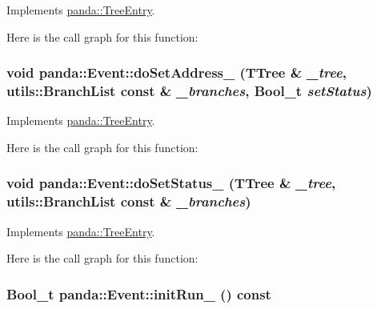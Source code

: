 Implements \hyperlink{classpanda_1_1TreeEntry_a44e70436de0dc8088885895ea0011a2d}{panda::TreeEntry}.

Here is the call graph for this function:\hypertarget{classpanda_1_1Event_abe96424e8e74474e69a0f7bee8b6d38e}{
\subsubsection[{doSetAddress\_\-}]{\setlength{\rightskip}{0pt plus 5cm}void panda::Event::doSetAddress\_\- (TTree \& {\em \_\-tree}, \/  {\bf utils::BranchList} const \& {\em \_\-branches}, \/  Bool\_\-t {\em setStatus})}}
\label{classpanda_1_1Event_abe96424e8e74474e69a0f7bee8b6d38e}


Implements \hyperlink{classpanda_1_1TreeEntry_abdb184144bf5a4ca8b0fdb6d06c5d4c1}{panda::TreeEntry}.

Here is the call graph for this function:\hypertarget{classpanda_1_1Event_a714f9999480dd623a883560e62717d85}{
\subsubsection[{doSetStatus\_\-}]{\setlength{\rightskip}{0pt plus 5cm}void panda::Event::doSetStatus\_\- (TTree \& {\em \_\-tree}, \/  {\bf utils::BranchList} const \& {\em \_\-branches})}}
\label{classpanda_1_1Event_a714f9999480dd623a883560e62717d85}


Implements \hyperlink{classpanda_1_1TreeEntry_a8c17222accba71d53b73ad6e2c3276a2}{panda::TreeEntry}.

Here is the call graph for this function:\hypertarget{classpanda_1_1Event_af555a708697c8a69575d69d6800ae458}{
\subsubsection[{initRun\_\-}]{\setlength{\rightskip}{0pt plus 5cm}Bool\_\-t panda::Event::initRun\_\- () const}}
\label{classpanda_1_1Event_af555a708697c8a69575d69d6800ae458}



